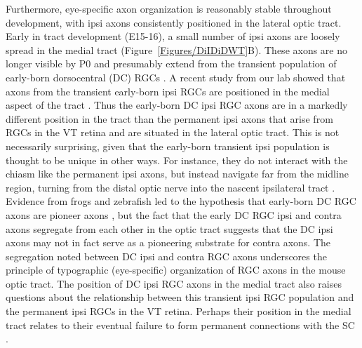 Furthermore, eye-specific axon organization is reasonably stable throughout development, with ipsi axons consistently positioned in the lateral optic tract.
Early in tract development (E15-16), a small number of ipsi axons are loosely spread in the medial tract (Figure~\ref{Figures/DiIDiDWT}B).
These axons are no longer visible by P0 and presumably extend from the transient population of early-born dorsocentral (DC) RGCs \cite{drager1985birth,soares2015transient}.
A recent study from our lab showed that axons from the transient early-born ipsi RGCs are positioned in the medial aspect of the tract \cite{soares2015transient}.
Thus the early-born DC ipsi RGC axons are in a markedly different position in the tract than the permanent ipsi axons that arise from RGCs in the VT retina and are situated in the lateral optic tract.
This is not necessarily surprising, given that the early-born transient ipsi population is thought to be unique in other ways.
For instance, they do not interact with the chiasm like the permanent ipsi axons, but instead navigate far from the midline region, turning from the distal optic nerve into the nascent ipsilateral tract \cite{godement1987study,godement1990retinal,marcus1995first}.
Evidence from frogs and zebrafish led to the hypothesis that early-born DC RGC axons are pioneer axons \cite{holt1984does,pittman2008pathfinding}, but the fact that the early DC RGC ipsi and contra axons segregate from each other in the optic tract \cite{soares2015transient} suggests that the DC ipsi axons may not in fact serve as a pioneering substrate for contra axons.
The segregation noted between DC ipsi and contra RGC axons underscores the principle of typographic (eye-specific) organization of RGC axons in the mouse optic tract.
The position of DC ipsi RGC axons in the medial tract also raises questions about the relationship between this transient ipsi RGC population and the permanent ipsi RGCs in the VT retina.
Perhaps their position in the medial tract relates to their eventual failure to form permanent connections with the SC \cite{soares2015transient}.

